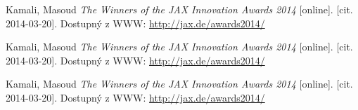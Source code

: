 
 \renewcommand{\appendixname}{Literatura}%

\begin{thebibliography}{10}




Kamali, Masoud \emph{The Winners of the JAX Innovation Awards 2014}
{[}online]. {[}cit. 2014-03-20]. Dostupný z WWW: \url{http://jax.de/awards2014/}

Kamali, Masoud \emph{The Winners of the JAX Innovation Awards 2014}
{[}online]. {[}cit. 2014-03-20]. Dostupný z WWW: \url{http://jax.de/awards2014/}

Kamali, Masoud \emph{The Winners of the JAX Innovation Awards 2014}
{[}online]. {[}cit. 2014-03-20]. Dostupný z WWW: \url{http://jax.de/awards2014/}

\end{thebibliography}